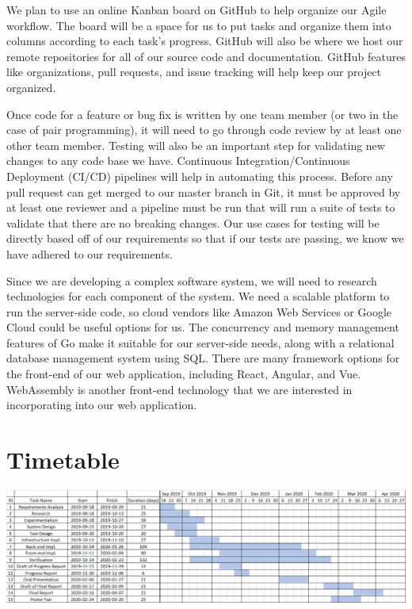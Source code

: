 \documentclass[letterpaper]{report}
\begin{document}
	We plan to use an online Kanban board on GitHub to help organize our Agile
	workflow. The board will be a space for us to put tasks and organize them
	into columns according to each task's progress. GitHub will also be where
	we host our remote repositories for all of our source code and
	documentation. GitHub features like organizations, pull requests, and issue
	tracking will help keep our project organized.

	Once code for a feature or bug fix is written by one team member (or two in
	the case of pair programming), it will need to go through code review by at
	least one other team member. Testing will also be an important step for
	validating new changes to any code base we have. Continuous
	Integration/Continuous Deployment (CI/CD) pipelines will help in automating
	this process. Before any pull request can get merged to our master branch
	in Git, it must be approved by at least one reviewer and a pipeline must be
	run that will run a suite of tests to validate that there are no breaking
	changes. Our use cases for testing will be directly based off of our
	requirements so that if our tests are passing, we know we have adhered to
	our requirements.

	Since we are developing a complex software system, we will need to research
	technologies for each component of the system. We need a scalable platform
	to run the server-side code, so cloud vendors like Amazon Web Services or
	Google Cloud could be useful options for us. The concurrency and memory
	management features of Go make it suitable for our server-side needs, along
	with a relational database management system using SQL. There are many
	framework options for the front-end of our web application, including
	React, Angular, and Vue. WebAssembly is another front-end technology that
	we are interested in incorporating into our web application.

	\section*{Timetable}
	\markright{}
	\includegraphics[width=\linewidth]{timetable.png}
\end{document}
